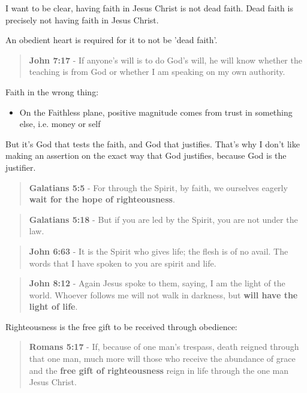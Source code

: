 \documentclass[11pt]{article}
\begin{document}
I want to be clear, having faith in Jesus Christ is not dead faith.
Dead faith is precisely not having faith in Jesus Christ.

An obedient heart is required for it to not be 'dead faith'.

\begin{quote}
\textbf{John 7:17} - If anyone's will is to do God's will, he will know whether the teaching is from God or whether I am speaking on my own authority.
\end{quote}

Faith in the wrong thing:
\begin{itemize}
\item On the Faithless plane, positive magnitude comes from trust in something else, i.e. money or self
\end{itemize}

But it's God that tests the faith, and God that justifies. That's why I don't like making an assertion on the exact way that God justifies, because God is the justifier.

\begin{quote}
\textbf{Galatians 5:5} - For through the Spirit, by faith, we ourselves eagerly \textbf{wait for the hope of righteousness}.
\end{quote}

\begin{quote}
\textbf{Galatians 5:18} - But if you are led by the Spirit, you are not under the law.
\end{quote}

\begin{quote}
\textbf{John 6:63} - It is the Spirit who gives life; the flesh is of no avail. The words that I have spoken to you are spirit and life.
\end{quote}

\begin{quote}
\textbf{John 8:12} - Again Jesus spoke to them, saying, I am the light of the world. Whoever follows me will not walk in darkness, but \textbf{will have the light of life}.
\end{quote}

Righteousness is the free gift to be received through obedience:

\begin{quote}
\textbf{Romans 5:17} - If, because of one man's trespass, death reigned through that one man, much more will those who receive the abundance of grace and the \textbf{free gift of righteousness} reign in life through the one man Jesus Christ.
\end{quote}
\end{document}
